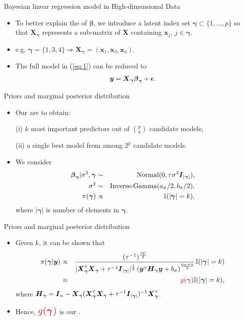 \documentclass[citecolor=blue,10pt]{beamer}
\def\bg{{\boldsymbol \gamma}}
\def\T{{ \mathrm{\scriptscriptstyle T} }}
\newcommand{\0} {\mbox{\boldmath$0$}}
\newcommand{\uH} {{\boldsymbol H}}
\newcommand{\uy}{{\boldsymbol y}}
\newcommand{\ux}{{\boldsymbol x}}
\newcommand{\uX}{{\boldsymbol X}}
\newcommand{\uI} {\mbox{\boldmath$I$}}
\newcommand{\ubeta}{{\boldsymbol \beta}}
\newcommand{\uepsilon} {\mbox{\boldmath $\epsilon$}}
\begin{document}
 \begin{frame}{Bayesian linear regression model in High-dimensional Data}
\begin{itemize}\itemsep=5mm
\item To better explain the {\color{red}{sparsity}} of $\ubeta$, we introduce a latent index set $\bg \subset \{1,\ldots,p\}$ so that $\uX_{\bg}$ represents a sub-matrix of $\uX$ containing $\ux_j$, $j\in\bg$.
 \item e.g. $\bg=\{1,3,4\} \Rightarrow \uX_{\bg}=(\ux_1,\ux_3,\ux_4)$.
\item The full model in (\ref{eq:1}) can be reduced to
\begin{eqnarray}\label{eq:2}
\uy=\uX_{\bg}\ubeta_{\bg} +\uepsilon.
\end{eqnarray}
\end{itemize}
\end{frame}





\begin{frame}{Priors and marginal posterior distribution}


\begin{itemize}\itemsep=5mm
\item Our {\color{blue}{Research Goals}} are to obtain: 
\item [(i)] $k$ most important predictors out of $\binom{p}{k}$ candidate models; 
\item [(ii)] a single best model from among $2^p$ candidate models.
\pause
\item We consider 
\begin{eqnarray*}
 \ubeta_{\bg}|\sigma^2,\bg &\sim&\text{Normal}(0,\tau \sigma^2 \uI_{|\bg|} ),\\
 \sigma^2 &\sim& \text{Inverse-Gamma}(a_{\sigma}/2,b_{\sigma}/2),\\
 \pi(\bg) &\propto& \mathbb{I}(|\bg|=k),
\end{eqnarray*}
where $|\bg|$ is number of elements in $\bg$.
\end{itemize}
\end{frame}

\begin{frame}{Priors and marginal posterior distribution }
\begin{itemize}\itemsep=5mm

\item Given $k$, it can be shown that 
\begin{eqnarray*}
\pi(\bg|\uy)&\propto&  \frac{(\tau^{-1})^{\frac{|\bg|}{2}}}{|\uX_{\bg}^{\T}
 \uX_{\bg}+\tau^{-1}\uI_{|\bg|} |^{\frac{1}{2}}  \left(\uy^{\T}\uH_{\bg}
 \uy+b_{\sigma}\right)^{\frac{a_{\sigma}+n}{2}  } }\mathbb{I}(|\bg|=k)\\
 &\equiv& {\color{red}{g(\bg)}}\mathbb{I}(|\bg|=k),
 \end{eqnarray*}
  where $\uH_{\bg} = \uI_n-\uX_{\bg}(\uX_{\bg}^{\T}\uX_{\bg}+\tau^{-1}\uI_{|\bg|})^{-1}\uX_{\bg}^{\T}$.
\item Hence, ${\color{red}{\Large g(\bg)}}$ is our {\color{red}{model selection criterion}}. 

\end{itemize}
\end{frame}
\end{document}
